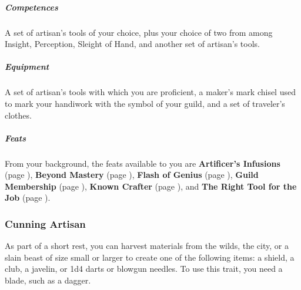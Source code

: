     \subparagraph{Competences} A set of artisan's tools of your choice, plus your choice of two from among Insight, Perception, Sleight of Hand, and another set of artisan's tools.

    \subparagraph{Equipment} A set of artisan's tools with which you are proficient, a maker's mark chisel used to mark your handiwork with the symbol of your guild, and a set of traveler's clothes.

    \subparagraph{Feats} From your background, the feats available to you are
    \textbf{Artificer's Infusions} (page \pageref{feat::artificersinfusion}),
    \textbf{Beyond Mastery} (page \pageref{feat::beyondmastery}),
    \textbf{Flash of Genius} (page \pageref{feat::flashofgenius}),
    \textbf{Guild Membership} (page \pageref{feat::guildmembership}),
    \textbf{Known Crafter} (page \pageref{feat::knowncrafter}), and
    \textbf{The Right Tool for the Job} (page \pageref{feat::therighttoolforthejob}).

    \subsubsection{Cunning Artisan} \label{feat::cunningartisan}
        As part of a short rest, you can harvest materials from the wilds, the city, or a slain beast of size small or larger to create one of the following items: a shield, a club, a javelin, or 1d4 darts or blowgun needles.
        To use this trait, you need a blade, such as a dagger.%

